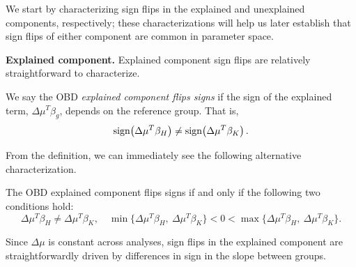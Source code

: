 
We start by characterizing sign flips in the explained and unexplained components, respectively; these characterizations will help us later establish
that sign flips of either component are common in parameter space.

\textbf{Explained component.} Explained component sign flips are relatively straightforward to characterize.
\begin{definition}
	\label{defn:sign_flip_explained}
	We say the OBD \emph{explained component flips signs} if the sign of the explained term, $\Delta\mu^T \beta_g$, depends on the reference group. That is,
	\begin{equation}
        \label{eq:sign_flip_condition_explained_neq}
		\operatorname{sign}\!\left(\Delta\mu^T \beta_H\right) \neq \operatorname{sign}\!\left(\Delta\mu^T \beta_K\right).
	\end{equation}
\end{definition}

From the definition, we can immediately see the following alternative characterization.
%
\begin{remark}
    \label{rmk:explained_ordering_sensitivity}
    The OBD explained component flips signs if and only if the following two conditions hold:
    \begin{equation}
    \label{eq:sign_flip_condition_explained}
        \Delta\mu^T \beta_H \neq \Delta\mu^T \beta_K, \quad \min\{\Delta\mu^T \beta_H,\ \Delta\mu^T \beta_K\} < 0 < \max\{\Delta\mu^T \beta_H,\ \Delta\mu^T \beta_K\}.
    \end{equation}
\end{remark}
Since $\Delta\mu$ is constant across analyses, sign flips in the explained component are straightforwardly driven
by differences in sign in the slope between groups.

